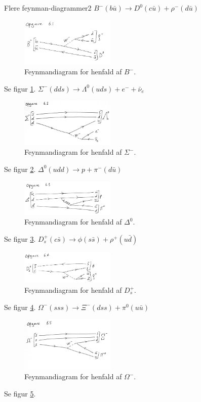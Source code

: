 \begin{opgave}{Flere feynman-diagrammer}{2}
\opg $B^- (b\bar{u}) \longrightarrow D^0(c\bar{u}) + \rho^-(d\bar{u})$
\begin{figure}[h]
  \centering
  \includegraphics[width=0.4\textwidth]{KernePartikel/opg61.png}
  \caption{Feynmandiagram for henfald af $B^-$.}
  \label{fig:opg61}
\end{figure}
Se figur \ref{fig:opg61}.
\opg $\Sigma^-(dds) \longrightarrow \Lambda^0 (uds) + e^- + \bar{\nu}_e$
\begin{figure}[h]
  \centering
  \includegraphics[width=0.4\textwidth]{KernePartikel/opg62.png}
  \caption{Feynmandiagram for henfald af $\Sigma^-$.}
  \label{fig:opg62}
\end{figure}
Se figur \ref{fig:opg62}.
\opg $\Delta^0 (udd) \longrightarrow p + \pi^- (d\bar{u})$
\begin{figure}[h]
  \centering
  \includegraphics[width=0.4\textwidth]{KernePartikel/opg63.png}
  \caption{Feynmandiagram for henfald af $\Delta^0$.}
  \label{fig:opg63}
\end{figure}
Se figur \ref{fig:opg63}.
\opg $D_s^+ (c\bar{s}) \longrightarrow \phi (s\bar{s}) + \rho^+ (u\bar{d})$
\begin{figure}[h]
  \centering
  \includegraphics[width=0.4\textwidth]{KernePartikel/opg64.png}
  \caption{Feynmandiagram for henfald af $D^{+}_{s}$.}
  \label{fig:opg64}
\end{figure}
Se figur \ref{fig:opg64}.
\opg $\Omega^-(sss) \longrightarrow \Xi^-(dss) + \pi^0(u\bar{u})$
\begin{figure}[h]
  \centering
  \includegraphics[width=0.4\textwidth]{KernePartikel/opg65.png}
  \caption{Feynmandiagram for henfald af $\Omega^-$.}
  \label{fig:opg65}
\end{figure}
Se figur \ref{fig:opg65}.
\end{opgave}